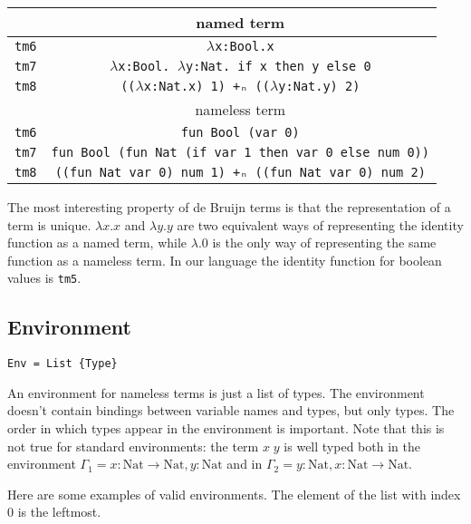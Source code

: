 \documentclass{article}
\begin{document}
\begin{center}
\begin{tabular}{ |c|c| } 
 \hline
 & named term \\
 \hline
 \texttt{tm6} & \texttt{$\lambda$x:Bool.x} \\
 \texttt{tm7} & \texttt{$\lambda$x:Bool. $\lambda$y:Nat. if x then y else 0} \\
 \texttt{tm8} & \texttt{(($\lambda$x:Nat.x) 1) +ₙ (($\lambda$y:Nat.y) 2)} \\
 \hline
 \hline
 
 & nameless term \\
 \hline
 \texttt{tm6} & \texttt{fun Bool (var 0)} \\
 \texttt{tm7} & \texttt{fun Bool (fun Nat (if var 1 then var 0 else num 0))} \\
 \texttt{tm8} & \texttt{((fun Nat var 0) num 1) +ₙ ((fun Nat var 0) num 2)} \\
 
 \hline
\end{tabular}
\end{center}

The most interesting property of de Bruijn terms is that the representation of a term is unique.
$\lambda x.x$ and $\lambda y.y$ are two equivalent ways of representing the identity function as a named term, while $\lambda.0$ is the only way of representing the same function as a nameless term.
In our language the identity function for boolean values is \texttt{tm5}.


\subsection{Environment}

\begin{verbatim}
Env = List {Type}
\end{verbatim}

An environment for nameless terms is just a list of types.
The environment doesn't contain bindings between variable names and types, but only types.
The order in which types appear in the environment is important.
Note that this is not true for standard environments: the term $x \; y$ is well typed both in the environment $\Gamma_1 = x:\text{Nat} \to \text{Nat}, y:\text{Nat}$ and in $\Gamma_2 = y:\text{Nat}, x:\text{Nat} \to \text{Nat}$. 

Here are some examples of valid environments.
The element of the list with index 0 is the leftmost.
\end{document}
